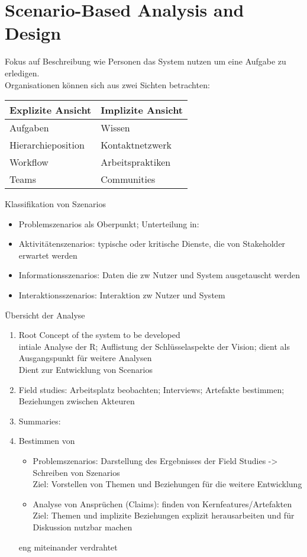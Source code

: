 \section{Scenario-Based Analysis and Design}
Fokus auf Beschreibung wie Personen das System nutzen um eine Aufgabe zu erledigen.\\
Organisationen können sich aus zwei Sichten betrachten:
\begin{table}[h]
	\centering
	\begin{tabular}{|p{20em}|p{20em}|}
		\hline
		\textbf{Explizite Ansicht} & \textbf{Implizite Ansicht}\\
		\hline
		Aufgaben & Wissen\\
		Hierarchieposition	& Kontaktnetzwerk\\
		Workflow 	& Arbeitspraktiken\\
		Teams	& Communities\\
		\hline
	\end{tabular}
\end{table}
Klassifikation von Szenarios
\begin{itemize}
	\item Problemszenarios als Oberpunkt; Unterteilung in:
	\item Aktivitätenszenarios: typische oder kritische Dienste, die von Stakeholder erwartet werden
	\item Informationsszenarios: Daten die zw Nutzer und System ausgetauscht werden
	\item Interaktionsszenarios: Interaktion zw Nutzer und System
\end{itemize}


Übersicht der Analyse
\begin{enumerate}
	\item Root Concept of the system to be developed\\
	intiale Analyse der R; Auflistung der Schlüsselaspekte der Vision; dient als Ausgangspunkt für weitere Analysen\\
	Dient zur Entwicklung von Scenarios
	\item Field studies: Arbeitsplatz beobachten; Interviews; Artefakte bestimmen; Beziehungen zwischen Akteuren
	\item Summaries:
	\item Bestimmen von
		\begin{itemize}
			\item Problemszenarios: Darstellung des Ergebnisses der Field Studies -> Schreiben von Szenarios\\
			Ziel: Vorstellen von Themen und Beziehungen für die weitere Entwicklung
			\item Analyse von Ansprüchen (Claims): finden von Kernfeatures/Artefakten\\
			Ziel: Themen und implizite Beziehungen explizit herausarbeiten und für Diskussion nutzbar machen
		\end{itemize}
	eng miteinander verdrahtet
\end{enumerate}

